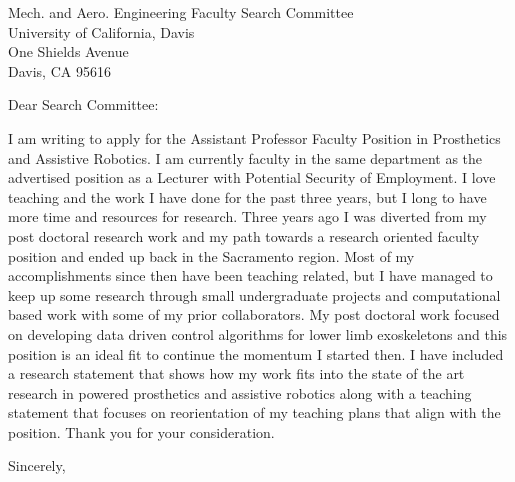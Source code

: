 \documentclass{letter}
\begin{document}
\begin{letter}{
    Mech. and Aero. Engineering Faculty Search Committee \\
    University of California, Davis \\
    One Shields Avenue \\
  Davis, CA 95616}
\opening{Dear Search Committee:}

I am writing to apply for the Assistant Professor Faculty Position in
Prosthetics and Assistive Robotics. I am currently faculty in the same
department as the advertised position as a Lecturer with Potential Security of
Employment. I love teaching and the work I have done for the past three years,
but I long to have more time and resources for research. Three years ago I was
diverted from my post doctoral research work and my path towards a research
oriented faculty position and ended up back in the Sacramento region. Most of
my accomplishments since then have been teaching related, but I have managed to
keep up some research through small undergraduate projects and computational
based work with some of my prior collaborators. My post doctoral work focused
on developing data driven control algorithms for lower limb exoskeletons and
this position is an ideal fit to continue the momentum I started then. I have
included a research statement that shows how my work fits into the state of the
art research in powered prosthetics and assistive robotics along with a
teaching statement that focuses on reorientation of my teaching plans that
align with the position. Thank you for your consideration.

\closing{Sincerely,}

\end{letter}
\end{document}
